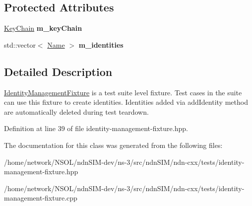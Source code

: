\subsection*{Protected Attributes}
\begin{DoxyCompactItemize}
\item 
\hyperlink{classndn_1_1security_1_1KeyChain}{Key\+Chain} {\bfseries m\+\_\+key\+Chain}\hypertarget{classndn_1_1security_1_1IdentityManagementFixture_a5bcb95f0b775d928dcff1ef6d3668801}{}\label{classndn_1_1security_1_1IdentityManagementFixture_a5bcb95f0b775d928dcff1ef6d3668801}

\item 
std\+::vector$<$ \hyperlink{classndn_1_1Name}{Name} $>$ {\bfseries m\+\_\+identities}\hypertarget{classndn_1_1security_1_1IdentityManagementFixture_a2fa324781b6bb7ff1efc93399ce355b0}{}\label{classndn_1_1security_1_1IdentityManagementFixture_a2fa324781b6bb7ff1efc93399ce355b0}

\end{DoxyCompactItemize}


\subsection{Detailed Description}
\hyperlink{classndn_1_1security_1_1IdentityManagementFixture}{Identity\+Management\+Fixture} is a test suite level fixture. Test cases in the suite can use this fixture to create identities. Identities added via add\+Identity method are automatically deleted during test teardown. 

Definition at line 39 of file identity-\/management-\/fixture.\+hpp.



The documentation for this class was generated from the following files\+:\begin{DoxyCompactItemize}
\item 
/home/network/\+N\+S\+O\+L/ndn\+S\+I\+M-\/dev/ns-\/3/src/ndn\+S\+I\+M/ndn-\/cxx/tests/identity-\/management-\/fixture.\+hpp\item 
/home/network/\+N\+S\+O\+L/ndn\+S\+I\+M-\/dev/ns-\/3/src/ndn\+S\+I\+M/ndn-\/cxx/tests/identity-\/management-\/fixture.\+cpp\end{DoxyCompactItemize}
